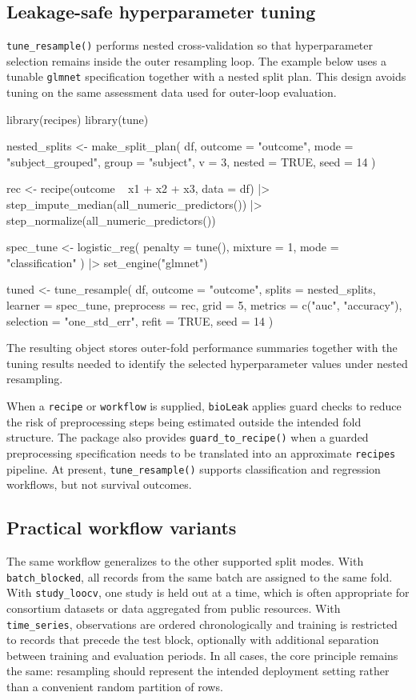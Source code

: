 \documentclass[article]{jss}
\begin{document}
\subsection{Leakage-safe hyperparameter tuning}

\texttt{tune\_resample()} performs nested cross-validation so that hyperparameter selection remains inside the outer resampling loop. The example below uses a tunable \texttt{glmnet} specification together with a nested split plan. This design avoids tuning on the same assessment data used for outer-loop evaluation.

\begin{CodeInput}
library(recipes)
library(tune)

nested_splits <- make_split_plan(
  df,
  outcome = "outcome",
  mode = "subject_grouped",
  group = "subject",
  v = 3,
  nested = TRUE,
  seed = 14
)

rec <- recipe(outcome ~ x1 + x2 + x3, data = df) |>
  step_impute_median(all_numeric_predictors()) |>
  step_normalize(all_numeric_predictors())

spec_tune <- logistic_reg(
  penalty = tune(),
  mixture = 1,
  mode = "classification"
) |>
  set_engine("glmnet")

tuned <- tune_resample(
  df,
  outcome = "outcome",
  splits = nested_splits,
  learner = spec_tune,
  preprocess = rec,
  grid = 5,
  metrics = c("auc", "accuracy"),
  selection = "one_std_err",
  refit = TRUE,
  seed = 14
)
\end{CodeInput}

\noindent
The resulting object stores outer-fold performance summaries together with the tuning results needed to identify the selected hyperparameter values under nested resampling.

When a \texttt{recipe} or \texttt{workflow} is supplied, \texttt{bioLeak} applies guard checks to reduce the risk of preprocessing steps being estimated outside the intended fold structure. The package also provides \texttt{guard\_to\_recipe()} when a guarded preprocessing specification needs to be translated into an approximate \texttt{recipes} pipeline. At present, \texttt{tune\_resample()} supports classification and regression workflows, but not survival outcomes.

\subsection{Practical workflow variants}

The same workflow generalizes to the other supported split modes. With \texttt{batch\_blocked}, all records from the same batch are assigned to the same fold. With \texttt{study\_loocv}, one study is held out at a time, which is often appropriate for consortium datasets or data aggregated from public resources. With \texttt{time\_series}, observations are ordered chronologically and training is restricted to records that precede the test block, optionally with additional separation between training and evaluation periods. In all cases, the core principle remains the same: resampling should represent the intended deployment setting rather than a convenient random partition of rows.
\end{document}
